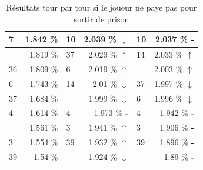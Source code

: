 \documentclass[letterpaper]{article}
\newcommand{\caseUp}[1][]{#1\textcolor[HTML]{008000}{$\mathbf{\uparrow}$}}
\newcommand{\caseStable}[1][]{#1\textcolor[HTML]{3779dd}{\textbf{-}}}
\newcommand{\caseDown}[1][]{#1\textcolor[HTML]{dd3737}{$\mathbf{\downarrow}$}}
\begin{document}
\begin{table}
\begin{tabular}{|l|r||l|r||l|r|}
	  \cellcolor[HTML]{1E90FF} 7 & 1.842 \% & \cellcolor[HTML]{1E90FF} 10 & 2.039 \% \caseDown[\hfill] & \cellcolor[HTML]{1E90FF} 10 & 2.037 \% \caseStable[\hfill] \\ \hline
	  \cellcolor[HTML]{8B1A1A} \textcolor{white}{5} & 1.819 \% & \cellcolor[HTML]{FFC1C1} 37 & 2.029 \% \caseUp[\hfill] & \cellcolor[HTML]{FF69B4} 14 & 2.033 \% \caseUp[\hfill] \\ \hline
	  \cellcolor[HTML]{E6E6FA} 36 & 1.809 \% & \cellcolor[HTML]{E6E6FA} 6 & 2.019 \% \caseUp[\hfill] & \cellcolor[HTML]{000000} \textcolor{white}{11} & 2.003 \% \caseUp[\hfill] \\ \hline
	  \cellcolor[HTML]{E6E6FA} 6 & 1.743 \% & \cellcolor[HTML]{FF69B4} 14 & 2.01 \% \caseDown[\hfill] & \cellcolor[HTML]{FFC1C1} 37 & 1.997 \% \caseDown[\hfill] \\ \hline
	  \cellcolor[HTML]{FFC1C1} 37 & 1.684 \% & \cellcolor[HTML]{000000} \textcolor{white}{11} & 1.999 \% \caseDown[\hfill] & \cellcolor[HTML]{E6E6FA} 6 & 1.996 \% \caseDown[\hfill] \\ \hline
	  \cellcolor[HTML]{A0522D} 4 & 1.614 \% & \cellcolor[HTML]{A0522D} 4 & 1.973 \% \caseStable[\hfill] & \cellcolor[HTML]{A0522D} 4 & 1.942 \% \caseStable[\hfill] \\ \hline
	  \cellcolor[HTML]{483D8B} \textcolor{white}{38} & 1.561 \% & \cellcolor[HTML]{EEEED1} 3 & 1.941 \% \caseUp[\hfill] & \cellcolor[HTML]{EEEED1} 3 & 1.906 \% \caseStable[\hfill] \\ \hline
	  \cellcolor[HTML]{EEEED1} 3 & 1.554 \% & \cellcolor[HTML]{8B1A1A} 39 & 1.932 \% \caseUp[\hfill] & \cellcolor[HTML]{8B1A1A} 39 & 1.896 \% \caseStable[\hfill] \\ \hline
	  \cellcolor[HTML]{8B1A1A} 39 & 1.54 \% & \cellcolor[HTML]{483D8B} \textcolor{white}{38} & 1.924 \% \caseDown[\hfill] & \cellcolor[HTML]{483D8B} \textcolor{white}{38} & 1.89 \% \caseStable[\hfill] \\ \hline
	\end{tabular}
	\caption{Résultats tour par tour si le joueur ne paye pas pour
	sortir de prison}
	\label{result_tour_paye_pas}
      \end{table}
\end{document}
